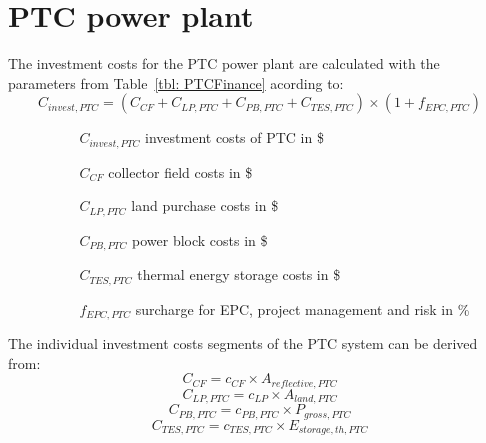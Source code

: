 \documentclass[Master,MEE,english]{twbook}%
\begin{document}
\section{PTC power plant}
The investment costs for the PTC power plant are calculated with the parameters from Table~\ref{tbl: PTCFinance} acording to:
\begin{equation}
C_{invest,PTC} = (C_{CF}+C_{LP,PTC}+C_{PB,PTC}+C_{TES,PTC})\times(1+f_{EPC,PTC}) \label{GL_CRInvest}
\end{equation} 
\begin{itemize}
\item[ ] 
\begin{itemize}
\item[ ] 
\begin{itemize}
\item[$C_{invest,PTC}$]investment costs of PTC in \$
\item[$C_{CF}$]collector field costs in \$
\item[$C_{LP,PTC}$]land purchase costs in \$
\item[$C_{PB,PTC}$]power block costs in \$
\item[$C_{TES,PTC}$]thermal energy storage costs in \$
\item[$f_{EPC,PTC}$]surcharge for EPC, project management and risk in \%
\end{itemize}
\end{itemize}
\end{itemize}
The individual investment costs segments of the PTC system can be derived from:
\begin{equation}
C_{CF} = c_{CF} \times A_{reflective,PTC}
\end{equation} 
\begin{equation}
C_{LP,PTC} = c_{LP} \times A_{land,PTC}
\end{equation} 
\begin{equation}
C_{PB,PTC} = c_{PB,PTC} \times P_{gross,PTC}
\end{equation} 
\begin{equation}
C_{TES,PTC} = c_{TES,PTC} \times E_{storage,th,PTC}
\end{equation} 
\end{document}
